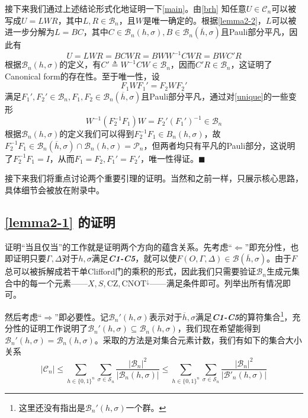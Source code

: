 \documentclass[8pt]{article}
\begin{document}
接下来我们通过上述结论形式化地证明一下\cref{main}。由\cref{brh} 知任意$U \in \mathcal C_n$可以被写成$U = LWR$，其中$L, R \in \mathcal B_n$，且$W$是唯一确定的。根据\cref{lemma2-2}，$L$可以被进一步分解为$L = BC$，其中$C \in \mathcal B_{n}(h, \sigma), B \in \mathcal B_n(\overline h, \sigma)$且Pauli部分平凡，因此有
\begin{equation}
U = LWR = BCWR = BWW^{-1}CWR = BWC'R
\end{equation}
根据$\mathcal B_n(h, \sigma)$的定义，有$C' \triangleq W^{-1}CW \in \mathcal B_n$，因而$C'R \in \mathcal B_n$，这证明了Canonical form的存在性。至于唯一性，设
\begin{equation}
F_1WF_1' = F_2WF_2'
\label{unique}
\end{equation}
满足$F_1', F_2' \in \mathcal B_n, F_1, F_2 \in \mathcal B_n(\overline h, \sigma)$且Pauli部分平凡，通过对\cref{unique}的一些变形
\begin{equation}
W^{-1}(F_2^{-1}F_1)W = F_2'(F_1')^{-1} \in \mathcal B_n
\end{equation}
根据$\mathcal B_n(h, \sigma)$的定义我们可以得到$F_2^{-1}F_1 \in B_n(h, \sigma)$，故$F_2^{-1}F_1 \in \mathcal B_n(\overline{h}, \sigma) \cap \mathcal B_n(h, \sigma) = \mathcal P_n$，但两者均只有平凡的Pauli部分，这说明了$F_2^{-1}F_1 = I$，从而$F_1 = F_2, F_1' = F_2'$，唯一性得证。\hfill$\blacksquare$

接下来我们将重点讨论两个重要引理的证明。当然和之前一样，只展示核心思路，具体细节会被放在附录中。

\subsection{\cref{lemma2-1} 的证明}
证明“当且仅当”的工作就是证明两个方向的蕴含关系。先考虑“$\Leftarrow$”即充分性，也即证明只要$\Gamma, \Delta$对于$h, \sigma$满足\textbf{\textit{C1-C5}}，就可以使$F(O, \Gamma, \Delta) \in \mathcal B(\overline h, \sigma)$。由于$F$总可以被拆解成若干单Clifford门的乘积的形式，因此我们只需要验证$\mathcal B_n$生成元集合中的每一个元素——$X, S, \text{CZ}, \text{CNOT}^{\downarrow}$——满足条件即可。列举出所有情况即可。

然后考虑“$\Rightarrow$”即必要性。记$\mathcal B_n'(h, \sigma)$表示对于$\overline h, \sigma$满足\textbf{\textit{C1-C5}}的算符集合\footnote{这里还没有指出是$\mathcal B_n'(h, \sigma)$一个群。}，充分性的证明工作说明了$\mathcal B_n'(h, \sigma) \subseteq \mathcal B_n(h, \sigma)$，我们现在希望能得到$\mathcal B_n'(h, \sigma) = \mathcal B_n(h, \sigma)$。采取的方法是对集合元素计数，我们有如下的集合大小关系
\begin{equation}
|\mathcal C_n| \le \sum_{h \in \{0, 1\}^n} \sum_{\sigma \in \mathcal S_n} \frac{|\mathcal B_n|^2}{|\mathcal B_n(h, \sigma)|} \le \sum_{h \in \{0, 1\}^n} \sum_{\sigma \in \mathcal S_n} \frac{|\mathcal B_n|^2}{|\mathcal B'_n(h, \sigma)|}
\end{equation}
\end{document}
